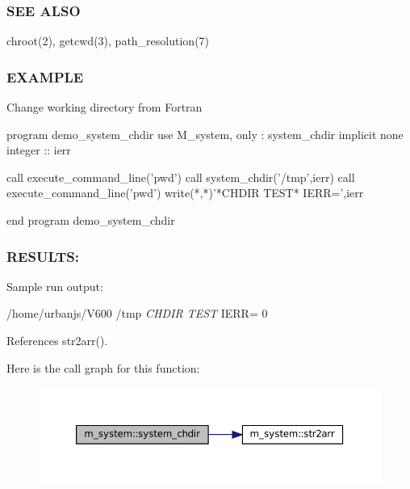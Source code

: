\subsubsection*{S\+EE A\+L\+SO}

\begin{DoxyVerb}chroot(2), getcwd(3), path_resolution(7)
\end{DoxyVerb}


\subsubsection*{E\+X\+A\+M\+P\+LE}

\begin{DoxyVerb}Change working directory from Fortran

  program demo_system_chdir
  use M_system, only : system_chdir
  implicit none
  integer :: ierr

  call execute_command_line('pwd')
  call system_chdir('/tmp',ierr)
  call execute_command_line('pwd')
  write(*,*)'*CHDIR TEST* IERR=',ierr

  end program demo_system_chdir
\end{DoxyVerb}


\subsubsection*{R\+E\+S\+U\+L\+TS\+:}

Sample run output\+:

/home/urbanjs/\+V600 /tmp {\itshape C\+H\+D\+IR T\+E\+ST} I\+E\+RR= 0 

References str2arr().

Here is the call graph for this function\+:
\nopagebreak
\begin{figure}[H]
\begin{center}
\leavevmode
\includegraphics[width=350pt]{namespacem__system_a47746b670cb21bae0957c9bb2bccf209_cgraph}
\end{center}
\end{figure}
\mbox{\label{namespacem__system_ace9ce0c8a9c8341a76b8903cd2390ce3}} 
